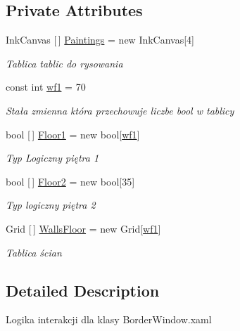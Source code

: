 \subsection*{Private Attributes}
\begin{DoxyCompactItemize}
\item 
Ink\+Canvas \mbox{[}$\,$\mbox{]} \mbox{\hyperlink{class_r6_1_1_border_window_aed1eaf9832ca05835a3a3375fcfd46c0}{Paintings}} = new Ink\+Canvas\mbox{[}4\mbox{]}
\begin{DoxyCompactList}\small\item\em Tablica tablic do rysowania \end{DoxyCompactList}\item 
const int \mbox{\hyperlink{class_r6_1_1_border_window_a516c0f0a2b98623da65e1bb69f4629a9}{wf1}} = 70
\begin{DoxyCompactList}\small\item\em Stała zmienna która przechowuje liczbe bool w tablicy \end{DoxyCompactList}\item 
bool \mbox{[}$\,$\mbox{]} \mbox{\hyperlink{class_r6_1_1_border_window_a3d4d51e8a9d4bba1d66d152127718b55}{Floor1}} = new bool\mbox{[}\mbox{\hyperlink{class_r6_1_1_border_window_a516c0f0a2b98623da65e1bb69f4629a9}{wf1}}\mbox{]}
\begin{DoxyCompactList}\small\item\em Typ Logiczny piętra 1 \end{DoxyCompactList}\item 
bool \mbox{[}$\,$\mbox{]} \mbox{\hyperlink{class_r6_1_1_border_window_a08f590f0e50727c447b137e55454e9d8}{Floor2}} = new bool\mbox{[}35\mbox{]}
\begin{DoxyCompactList}\small\item\em Typ logiczny piętra 2 \end{DoxyCompactList}\item 
Grid \mbox{[}$\,$\mbox{]} \mbox{\hyperlink{class_r6_1_1_border_window_ab935e3b07814c16d3bda8739d094242b}{Walls\+Floor}} = new Grid\mbox{[}\mbox{\hyperlink{class_r6_1_1_border_window_a516c0f0a2b98623da65e1bb69f4629a9}{wf1}}\mbox{]}
\begin{DoxyCompactList}\small\item\em Tablica ścian \end{DoxyCompactList}\end{DoxyCompactItemize}


\subsection{Detailed Description}
Logika interakcji dla klasy Border\+Window.\+xaml 



